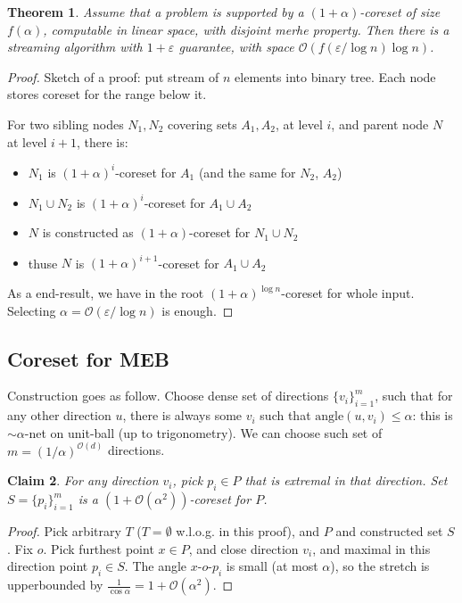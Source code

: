 \documentclass[11pt]{article}
\newtheorem{theorem}{Theorem}
\newtheorem{claim}[theorem]{Claim}
\newcommand{\bigo}{\mathcal{O}}
\begin{document}
\begin{theorem}
Assume that a problem is supported by a $(1+\alpha)$-coreset of size $f(\alpha)$, computable in linear space, with disjoint merhe property. Then there is a streaming algorithm with $1+\varepsilon$ guarantee, with space $\bigo(f(\varepsilon/\log n) \log n)$.
\end{theorem}
\begin{proof}
Sketch of a proof: put stream of $n$ elements into binary tree. Each node stores coreset for the range below it. 

For two sibling nodes $N_1, N_2$ covering sets $A_1, A_2$, at level $i$, and parent node $N$ at level $i+1$, there is:
\begin{itemize}
\item $N_1$ is $(1+\alpha)^i$-coreset for $A_1$ (and the same for $N_2$, $A_2$)
\item $N_1 \cup N_2$ is $(1+\alpha)^i$-coreset for $A_1 \cup A_2$
\item $N$ is constructed as $(1+\alpha)$-coreset for $N_1 \cup N_2$
\item thuse $N$ is $(1+\alpha)^{i+1}$-coreset for $A_1 \cup A_2$
\end{itemize}

As a end-result, we have in the root $(1+\alpha)^{\log n}$-coreset for whole input. Selecting $\alpha = \bigo(\varepsilon/\log n)$ is enough.
\end{proof}

\subsection{Coreset for MEB}
Construction goes as follow. Choose dense set of directions $\{v_i\}_{i=1}^m$, such that for any other direction $u$, there is always some $v_i$ such that $\text{angle}(u,v_i) \le \alpha$: this is $\sim \alpha$-net on unit-ball (up to trigonometry). We can choose such set of $m = (1/\alpha)^{\bigo(d)}$ directions.

\begin{claim}
For any direction $v_i$, pick $p_i \in P$ that is extremal in that direction. 
Set $S = \{p_i\}_{i=1}^m$  is a $(1+\bigo(\alpha^2))$-coreset for $P$.
\end{claim}
\begin{proof}
Pick arbitrary $T$ ($T= \emptyset$ w.l.o.g. in this proof), and $P$ and constructed set $S$. Fix $o$. Pick furthest point $x \in P$, and close direction $v_i$, and maximal in this direction point $p_i \in S$. The angle $x$-$o$-$p_i$ is small (at most $\alpha$), so the stretch is upperbounded by $\frac{1}{\cos \alpha} = 1 + \bigo(\alpha^2)$.
\end{proof}
\end{document}
